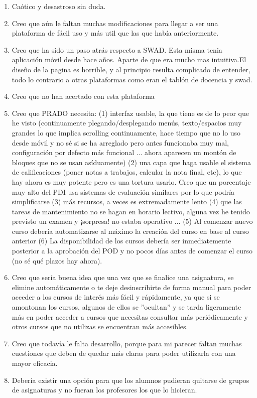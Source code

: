 \begin{enumerate}
\item Caótico y desastroso sin duda.
\item Creo que aún le faltan muchas modificaciones para llegar a ser una plataforma de fácil uso y más util que las que había anteriormente.
\item Creo que ha sido un paso atrás respecto a SWAD. Esta misma tenia aplicación móvil desde hace años. Aparte de que era mucho mas intuitiva.El diseño de la pagina es horrible, y al principio resulta complicado de entender, todo lo contrario a otras plataformas como eran el tablón de docencia y swad.
\item Creo que no han acertado con esta plataforma
\item Creo que PRADO necesita: (1) interfaz usable, la que tiene es de lo peor que he visto (continuamente plegando/desplegando menús, texto/espacios muy grandes lo que implica scrolling continuamente, hace tiempo que no lo uso desde móvil y no sé si se ha arreglado pero antes funcionaba muy mal, configuración por defecto más funcional ... ahora aparecen un montón de bloques que no se usan asíduamente) (2) una capa que haga usable el sistema de calificaciones (poner notas a trabajos, calcular la nota final, etc), lo que hay ahora es muy potente pero es una tortura usarlo. Creo que un porcentaje muy alto del PDI usa sistemas de evaluación similares por lo que podría simplificarse (3) más recursos, a veces es extremadamente lento (4) que las tareas de mantenimiento no se hagan en horario lectivo, alguna vez he tenido previsto un examen y ¡sorpresa! no estaba operativo ... (5) Al comenzar nuevo curso debería automatizarse al máximo la creación del curso en base al curso anterior (6) La disponibilidad de los cursos debería ser inmediatemente posterior a la aprobación del POD y no pocos días antes de comenzar el curso (no sé qué plazos hay ahora).
\item Creo que sería buena idea que una vez que se finalice una asignatura, se elimine automáticamente o te deje desinscribirte de forma manual para poder acceder a los cursos de interés más fácil y rápidamente, ya que si se amontonan los cursos, algunos de ellos se ''ocultan'' y se tarda ligeramente más en poder acceder a cursos que necesitas consultar más periódicamente y otros cursos que no utilizas se encuentran más accesibles.
\item Creo que todavía le falta desarrollo, porque para mi parecer faltan muchas cuestiones que deben de quedar más claras para poder utilizarla con una mayor eficacia. 
\item Debería existir una opción para que los alumnos pudieran quitarse de grupos de asignaturas y no fueran los profesores los que lo hicieran.

\end{enumerate}
